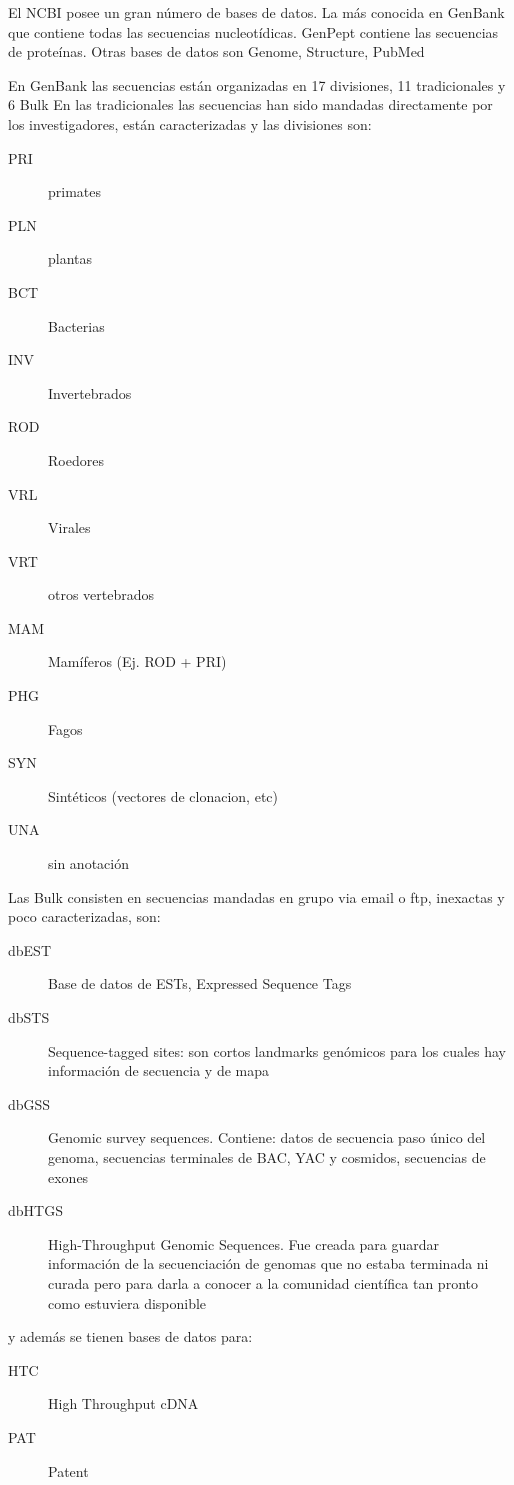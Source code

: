 \documentclass[letter,11pt]{book}
\begin{document}
El NCBI posee un gran número de bases de datos. La más conocida en GenBank que contiene todas las secuencias nucleotídicas. GenPept contiene las secuencias de proteínas. Otras bases de datos son Genome, Structure, PubMed

En GenBank las secuencias están organizadas en 17 divisiones, 11 tradicionales y 6 Bulk
En las tradicionales las secuencias han sido mandadas directamente por los investigadores, están caracterizadas y las divisiones son:

\begin{description}
\item[PRI] primates
\item[PLN] plantas
\item[BCT] Bacterias
\item[INV] Invertebrados
\item[ROD] Roedores
\item[VRL] Virales
\item[VRT] otros vertebrados
\item[MAM] Mamíferos (Ej. ROD + PRI)
\item[PHG] Fagos
\item[SYN] Sintéticos (vectores de clonacion, etc)
\item[UNA] sin anotación
\end{description}


Las Bulk consisten en secuencias mandadas en grupo via email o ftp, inexactas y poco caracterizadas, son:

\begin{description}
\item[dbEST] Base de datos de ESTs, Expressed Sequence Tags
\item[dbSTS] Sequence-tagged sites: son cortos landmarks genómicos para los cuales hay información de secuencia y de mapa 
\item[dbGSS] Genomic survey sequences. Contiene: datos de secuencia paso único del genoma, secuencias terminales de BAC, YAC y cosmidos, secuencias de exones
\item[dbHTGS] High-Throughput Genomic Sequences. Fue creada para guardar información de la secuenciación de genomas que no estaba terminada ni curada pero para darla a conocer a la comunidad científica tan pronto como estuviera disponible
\end{description}

y además se tienen bases de datos para:

\begin{description}
\item[HTC] High Throughput cDNA
\item[PAT] Patent
\end{description}
\end{document}
